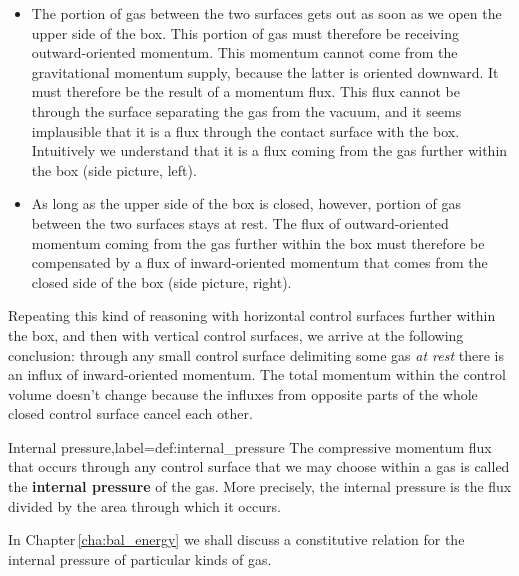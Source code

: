 \documentclass[a4paper,12pt,%
onecolumn,oneside,%
british%
]{memoir}
\renewcommand*{\|}[1][]{\nonscript\:#1\vert\nonscript\:\mathopen{}}
\newcommand*{\chap}{Chapter}%
\begin{document}
\begin{itemize}
\item The portion of gas between the two surfaces gets out as soon as we open the upper side of the box. This portion of gas must therefore be receiving outward-oriented momentum. This momentum cannot come from the gravitational momentum supply, because the latter is oriented downward. It must therefore be the result of a momentum flux. This flux cannot be through the surface separating the gas from the vacuum, and it seems implausible that it is a flux through the contact surface with the box. Intuitively we understand that it is a flux coming from the gas further within the box (side picture, left).
\item As long as the upper side of the box is closed, however, portion of gas between the two surfaces stays at rest. The flux of outward-oriented momentum coming from the gas further within the box must therefore be compensated by a flux of inward-oriented momentum that comes from the closed side of the box (side picture, right).
\end{itemize}

%
Repeating this kind of reasoning with horizontal control surfaces further within the box, and then with vertical control surfaces, we arrive at the following conclusion: through any small control surface delimiting some gas \emph{at rest} there is an influx of inward-oriented momentum. The total momentum within the control volume doesn't change because the influxes from opposite parts of the whole closed control surface cancel each other.
\begin{definition}{Internal pressure,label={def:internal_pressure}}
  The compressive momentum flux that occurs through any control surface that we may choose within a gas is called the \textbf{internal pressure} of the gas. More precisely, the internal pressure is the flux divided by the area through which it occurs.
\end{definition}
In \chap\,\ref{cha:bal_energy} we shall discuss a constitutive relation for the internal pressure of particular kinds of gas.
\end{document}
